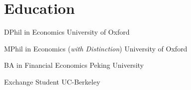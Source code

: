 \documentclass[11pt,letterpaper]{report}
\begin{document}
    \section*{Education}

    \begin{description}[labelwidth=2.4cm, leftmargin=3.5cm, font=\normalfont]
        \item[2024 -]  DPhil in Economics \hfill University of Oxford
        \item[2022 - 2024]  MPhil in Economics (\textit{with Distinction}) \hfill University of Oxford
        \item[2018 - 2022]  BA in Financial Economics \hfill Peking University
        \item[2021] Exchange Student \hfill UC-Berkeley

    \end{description}
\end{document}
